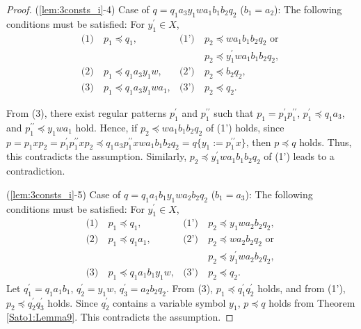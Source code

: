 \begin{proof}
\smallskip

\noindent
(\ref{lem:3consts_i}-4) Case of $q=q_{1}a_{3}y_{1}wa_{1}b_{1}b_{2}q_{2}$ ($b_{1}=a_{2}$):
The following conditions must be satisfied: For $y_{1}^{\prime} \in X$,
\begin{align*}
\textrm{(1)}~& p_{1} \preceq q_{1}, & \textrm{(1')}~& p_{2} \preceq wa_{1}b_{1}b_{2}q_{2} \mbox{ or } \\
& & & p_{2} \preceq y_{1}^{\prime}wa_{1}b_{1}b_{2}q_{2},\\
\textrm{(2)}~& p_{1} \preceq q_{1}a_{3}y_{1}w, & \textrm{(2')}~& p_{2} \preceq b_{2}q_{2}, \\
\textrm{(3)}~& p_{1} \preceq q_{1}a_{3}y_{1}wa_{1}, & \textrm{(3')}~& p_{2} \preceq q_{2}.
\end{align*}

From (3), there exist regular patterns $p_{1}^{\prime}$ and $p_{1}^{\prime\prime}$ such that $p_{1}=p_{1}^{\prime}p_{1}^{\prime\prime}$, $p_{1}^{\prime} \preceq q_{1}a_{3}$, and $p_{1}^{\prime\prime} \preceq y_{1}wa_{1}$ hold.
Hence, if $p_{2} \preceq wa_{1}b_{1}b_{2}q_{2}$ of (1') holds, since $p=p_{1}xp_{2}=p_{1}^{\prime}p_{1}^{\prime\prime}xp_{2}\preceq q_{1}a_{3}p_{1}^{\prime\prime}xwa_{1}b_{1}b_{2}q_{2}=q \{ y_{1} := p_{1}^{\prime\prime}x \}$, then $p \preceq q$ holds.
Thus, this contradicts the assumption.
Similarly, $p_{2} \preceq y_{1}^{\prime}wa_{1}b_{1}b_{2}q_{2}$ of (1') leads to a contradiction.

\smallskip

\noindent
(\ref{lem:3consts_i}-5) Case of $q=q_{1}a_{1}b_{1}y_{1}wa_{2}b_{2}q_{2}$ ($b_{1}=a_{3}$):
The following conditions must be satisfied: For $y_{1}^{\prime} \in X$,
\begin{align*}
\textrm{(1)}~& p_{1} \preceq q_{1}, & \textrm{(1')}~& p_{2} \preceq y_{1}wa_{2}b_{2}q_{2}, \\
\textrm{(2)}~& p_{1} \preceq q_{1}a_{1}, & \textrm{(2')}~& p_{2} \preceq wa_{2}b_{2}q_{2} \mbox{ or } \\
& & & p_{2} \preceq y_{1}^{\prime}wa_{2}b_{2}q_{2},\\
\textrm{(3)}~& p_{1} \preceq q_{1}a_{1}b_{1}y_{1}w, & \textrm{(3')}~& p_{2} \preceq q_{2}.
\end{align*}
\noindent
Let $q_{1}^{\prime}=q_{1}a_{1}b_{1}$, $q_{2}^{\prime}=y_{1}w$, $q_{3}^{\prime}=a_{2}b_{2}q_{2}$.
From (3), $p_{1} \preceq q_{1}^{\prime}q_{2}^{\prime}$ holds, and from (1'), $p_{2} \preceq q_{2}^{\prime}q_{3}^{\prime}$ holds.
Since $q_{2}^{\prime}$ contains a variable symbol $y_{1}$, $p\preceq q$ holds from Theorem \ref{Sato1:Lemma9}.
This contradicts the assumption.
\end{proof}

